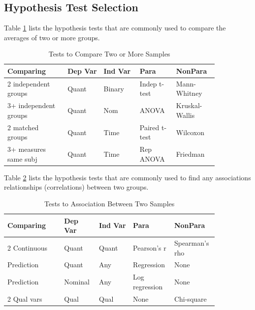 \subsection{Hypothesis Test Selection}

Table \ref{tab06.07} lists the hypothesis tests that are commonly used to compare the averages of two or more groups.

\begin{table}[H]
	\centering
	\begin{tabularx}{0.95\linewidth}{p{0.25\linewidth}
			p{0.15\linewidth}
			p{0.15\linewidth}
			p{0.15\linewidth}
			p{0.15\linewidth}
		}
		\toprule
		\textbf{Comparing} & 
			\textbf{Dep Var} & 
			\textbf{Ind Var} &
			\textbf{Para} & 
			\textbf{NonPara} \\
		\midrule
		2 independent \newline groups & Quant & Binary & Indep t-test & Mann-Whitney \\
		3+ independent \newline groups & Quant & Nom & ANOVA & Kruskal-Wallis \\
		2 matched \newline groups & Quant & Time & Paired t-test & Wilcoxon \\	
		3+ measures \newline same subj & Quant & Time & Rep ANOVA & Friedman \\		

		\bottomrule
	\end{tabularx}
	\caption{Tests to Compare Two or More Samples}
	\label{tab06.07}
\end{table}


Table \ref{tab06.08} lists the hypothesis tests that are commonly used to find any associations relationships (correlations) between two groups.

\begin{table}[H]
	\centering
	\begin{tabularx}{0.95\linewidth}{p{0.25\linewidth}
			p{0.15\linewidth}
			p{0.15\linewidth}
			p{0.15\linewidth}
			p{0.15\linewidth}
		}
		\toprule
		\textbf{Comparing} & 
		\textbf{Dep Var} & 
		\textbf{Ind Var} &
		\textbf{Para} & 
		\textbf{NonPara} \\
		\midrule
		2 Continuous & Quant & Quant & Pearson's r & Spearman's rho \\
		Prediction & Quant & Any & Regression & None \\
		Prediction & Nominal & Any & Log \newline regression & None \\	
		2 Qual vars & Qual & Qual & None & Chi-square \\		
		
		\bottomrule
	\end{tabularx}
	\caption{Tests to Association Between Two Samples}
	\label{tab06.08}
\end{table}


